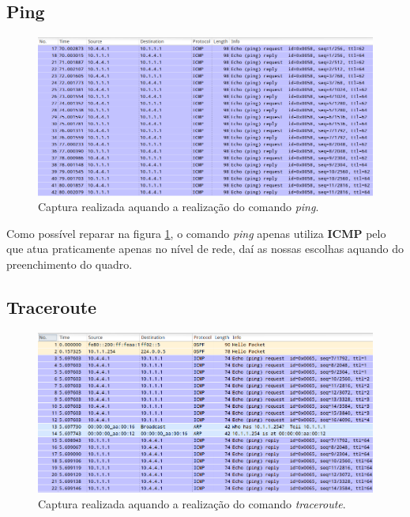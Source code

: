 \documentclass{llncs}
\begin{document}
\subsection{Ping}

\begin{figure}[H]
\begin{center}
\includegraphics[scale=0.4]{ping.png}
\end{center}
\caption{\label{fig:ping}Captura realizada aquando a realização do comando \emph{ping}.}
\end{figure}

Como possível reparar na figura \ref{fig:ping}, o comando \emph{ping} apenas utiliza \textbf{ICMP} pelo que atua praticamente apenas no nível de rede, daí as nossas escolhas aquando do preenchimento do quadro.


\subsection{Traceroute}

\begin{figure}[H]
\begin{center}
\includegraphics[scale=0.4]{traceroute.png}
\end{center}
\caption{\label{fig:traceroute}Captura realizada aquando a realização do comando \emph{traceroute}.}
\end{figure}
\end{document}
